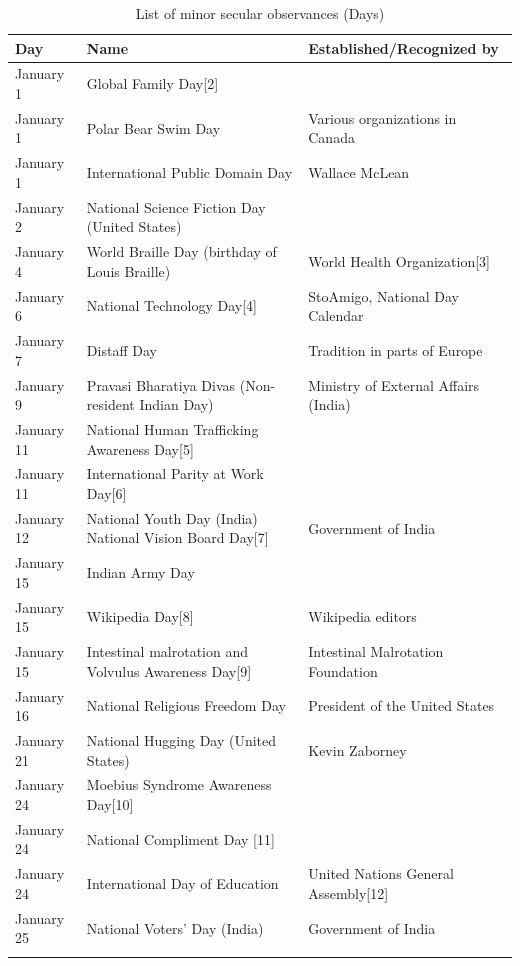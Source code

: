 \documentclass[
  openany]{book}
\begin{document}
\begin{longtable}[t]{>{\raggedright\arraybackslash}p{8em}>{\raggedright\arraybackslash}p{20em}>{\raggedright\arraybackslash}p{12em}}
\caption{\label{tab:day-observances}List of minor secular observances (Days)}\\
\toprule
Day & Name & Established/Recognized by\\
\midrule
January 1 & Global Family Day[2] & \\
January 1 & Polar Bear Swim Day & Various organizations in Canada\\
January 1 & International Public Domain Day & Wallace McLean\\
January 2 & National Science Fiction Day (United States) & \\
January 4 & World Braille Day (birthday of Louis Braille) & World Health Organization[3]\\
\addlinespace
January 6 & National Technology Day[4] & StoAmigo, National Day Calendar\\
January 7 & Distaff Day & Tradition in parts of Europe\\
January 9 & Pravasi Bharatiya Divas (Non-resident Indian Day) & Ministry of External Affairs (India)\\
January 11 & National Human Trafficking Awareness Day[5] & \\
January 11 & International Parity at Work Day[6] & \\
\addlinespace
January 12 & National Youth Day (India)
National Vision Board Day[7] & Government of India\\
January 15 & Indian Army Day & \\
January 15 & Wikipedia Day[8] & Wikipedia editors\\
January 15 & Intestinal malrotation and Volvulus Awareness Day[9] & Intestinal Malrotation Foundation\\
January 16 & National Religious Freedom Day & President of the United States\\
\addlinespace
January 21 & National Hugging Day (United States) & Kevin Zaborney\\
January 24 & Moebius Syndrome Awareness Day[10] & \\
January 24 & National Compliment Day [11] & \\
January 24 & International Day of Education & United Nations General Assembly[12]\\
January 25 & National Voters' Day (India) & Government of India\\
\addlinespace

\end{longtable}
\end{document}
